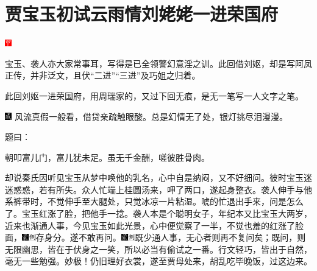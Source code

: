 

\chapter{贾宝玉初试云雨情\hspace{.5em}刘姥姥一进荣国府}

\includegraphics[width=3mm]{../Images/00002}{\kaishu 宝玉、袭人亦大家常事耳，写得是已全领警幻意淫之训。此回借刘妪，却是写阿凤正传，并非泛文，且伏“二进”“三进”及巧姐之归着。

此回刘妪一进荣国府，用周瑞家的，又过下回无痕，是无一笔写一人文字之笔。

\includegraphics[width=3mm]{../Images/00005}  \kaishu 风流真假一般看，借贷亲疏触眼酸。总是幻情无了处，银灯挑尽泪漫漫。}

题曰：

朝叩富儿门，富儿犹未足。虽无千金酬，嗟彼胜骨肉。

却说秦氏因听见宝玉从梦中唤他的乳名，心中自是纳闷，又不好细问。彼时宝玉迷迷惑惑，若有所失。众人忙端上桂圆汤来，呷了两口，遂起身整衣。袭人伸手与他系裤带时，不觉伸手至大腿处，只觉冰凉一片粘湿。唬的忙退出手来，问是怎么了。宝玉红涨了脸，把他手一捻。袭人本是个聪明女子，年纪本又比宝玉大两岁，近来也渐通人事，今见宝玉如此光景，心中便觉察了一半，不觉也羞的红涨了脸面，{\includegraphics[width=3mm]{../Images/00006}\includegraphics[width=3mm]{../Images/00011}\footnotesize \kaishu 存身分。}遂不敢再问。{\includegraphics[width=3mm]{../Images/00006}\includegraphics[width=3mm]{../Images/00011}\footnotesize \kaishu 既少通人事，无心者则再不复问矣；既问，则无限幽思，皆在于伏身之一笑，所以必当有偷试之一番。行文轻巧，皆出于自然，毫无一些勉强。妙极！}仍旧理好衣裳，遂至贾母处来，胡乱吃毕晚饭，过这边来。

